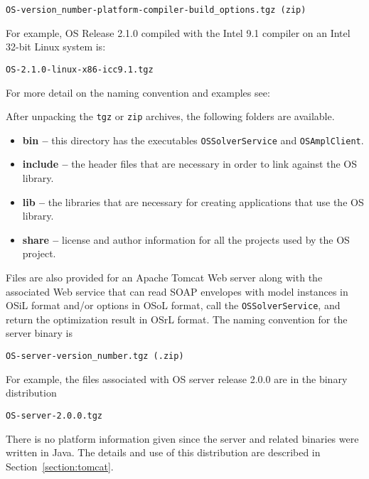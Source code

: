 \begin{verbatim}
OS-version_number-platform-compiler-build_options.tgz (zip)
\end{verbatim}
For example, OS  Release 2.1.0 compiled with the Intel 9.1 compiler on an Intel 32-bit Linux system is:
\begin{verbatim}
OS-2.1.0-linux-x86-icc9.1.tgz
\end{verbatim}

For more detail on the naming convention and examples see:

\medskip
\noindent{\tt\UrlCoinNames}
\medskip

After unpacking the {\tt tgz} or {\tt zip} archives, the following folders are available.
\begin{itemize}

\item[] {\bf bin --} this directory has the executables {\tt OSSolverService} 
and {\tt OSAmplClient}.

\item[]  {\bf include --} the header files that are necessary in order to link against the OS library.

\item[] {\bf lib --} the libraries that are necessary for creating applications that use the OS library.

\item[] {\bf  share --} license and author information for all the projects used by the OS project.
\end{itemize}



Files are also provided for an Apache Tomcat Web server along with the associated Web service
that can
read SOAP  envelopes with model instances in OSiL format and/or options in 
OSoL format, call the {\tt OSSolverService},
and return the optimization result in OSrL format.
The naming convention for the server binary is
\begin{verbatim}
OS-server-version_number.tgz (.zip)
\end{verbatim}
For example, the files associated with  OS server release 2.0.0 are in the binary distribution
\begin{verbatim}
OS-server-2.0.0.tgz
\end{verbatim}
There is no platform information given since the server and related binaries were written in Java.
\ifdevelop
The details and use of this distribution are described in Section~\ref{section:tomcat}.
\fi


